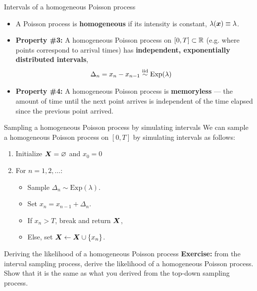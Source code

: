 \documentclass[aspectratio=169]{beamer}
\begin{document}
\begin{frame}{Intervals of a homogeneous Poisson process}
    \begin{itemize}
        \itemsep1em
        
        \item A Poisson process is \textbf{homogeneous} if its intensity is constant, $\lambda(\boldsymbol{x}) \equiv \lambda$.
        
        \item<2->\textbf{Property \#3:} A homogeneous Poisson process on $[0, T] \subset \mathbb{R}$ (e.g. where points correspond to arrival times) has \textbf{independent, exponentially distributed intervals},
        \begin{align}
            \Delta_n = x_n - x_{n-1} &\stackrel{\text{iid}}{\sim} \mathrm{Exp}(\lambda)
        \end{align}
        
        \item<3-> \textbf{Property \#4:} A homogeneous Poisson process is \textbf{memoryless} --- the amount of time until the next point arrives is independent of the time elapsed since the previous point arrived.
    \end{itemize}
\end{frame}

\begin{frame}{Sampling a homogeneous Poisson process by simulating intervals}
We can sample a homogeneous Poisson process on $[0, T]$ by simulating intervals as follows:
\begin{enumerate}
    \item Initialize $\boldsymbol{X} = \varnothing$ and $x_0 = 0$
    \item For $n=1, 2, \ldots$:
    \begin{itemize}
        \item Sample $\Delta_n \sim \mathrm{Exp}(\lambda)$.
        \item Set $x_n = x_{n-1} + \Delta_n$.
        \item If $x_n > T$, break and return $\boldsymbol{X}$,
        \item Else, set $\boldsymbol{X} \leftarrow \boldsymbol{X} \cup \{x_n\}$.
    \end{itemize}
\end{enumerate}
\end{frame}

\begin{frame}[t]{Deriving the likelihood of a homogeneous Poisson process}
    \textbf{Exercise:} from the interval sampling process, derive the likelihood of a homogeneous Poisson process. Show that it is the same as what you derived from the top-down sampling process.
\end{frame}
\end{document}
